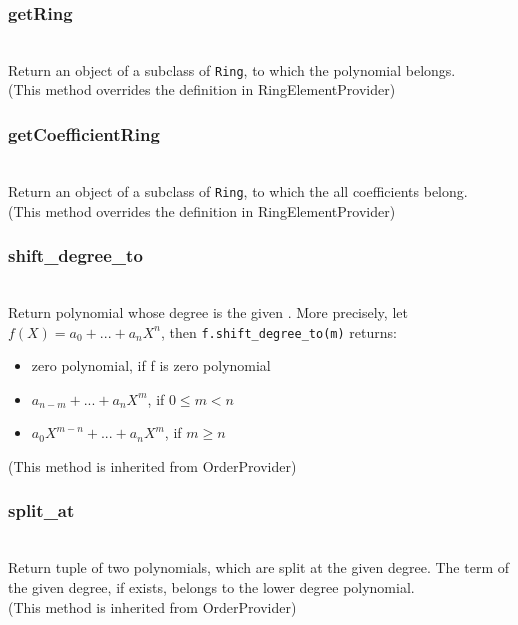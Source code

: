   \subsubsection{getRing}
  \\
  \spacing
  \quad Return an object of a subclass of {\tt Ring},
  to which the polynomial belongs.\\
  (This method overrides the definition in RingElementProvider)

  \subsubsection{getCoefficientRing}
  \\
  \spacing
  \quad Return an object of a subclass of {\tt Ring},
  to which the all coefficients belong.\\
  (This method overrides the definition in RingElementProvider)

  \subsubsection{shift\_degree\_to}
  \\
  \spacing
  \quad Return polynomial whose degree is the given .
  More precisely, let \(f(X) = a_0 + ... + a_n X^n\), then
  {\tt f.shift\_degree\_to(m)} returns:
  \begin{itemize}
  \item zero polynomial, if f is zero polynomial
  \item \(a_{n-m} + ... + a_n X^m\), if \(0 \leq m < n\)
  \item \(a_0 X^{m-n} + ... + a_n X^m\), if \(m \geq n\)
  \end{itemize}
  (This method is inherited from OrderProvider)

  \subsubsection{split\_at}
  \\
  \spacing
  \quad Return tuple of two polynomials, which are split at the
  given degree. The term of the given degree, if exists, belongs to
  the lower degree polynomial.\\
  (This method is inherited from OrderProvider)  


